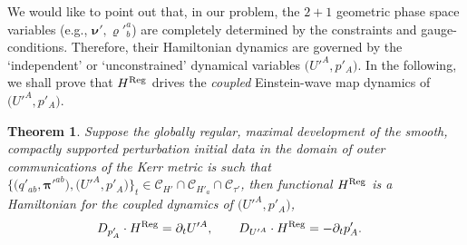 \documentclass[11pt]{article}
\numberwithin{equation}{section}
\def\ptl{\partial}%
\def\mbo#1{\boldsymbol{#1}}%
\numberwithin{equation}{section}
\newtheorem{Theorem}{Theorem}[section]
\begin{document}
We would like to point out that, in our problem, the $2+1$ geometric phase space variables \big(e.g., $\mbo{\nu}', \varrho'^a_b$\big) are completely determined by the constraints and gauge-conditions. Therefore, their Hamiltonian dynamics are governed by the `independent' or `unconstrained' dynamical variables $\bigl(U'^A, p'_A\bigr)$. In the following, we shall prove that $H^{{\rm Reg}}$ drives the \emph{coupled} Einstein-wave map dynamics of $\bigl(U'^A, p'_A\bigr)$.

\begin{Theorem}
Suppose the globally regular, maximal development of the smooth, compactly supported perturbation initial data in the domain of outer communications of the Kerr metric is such that $\bigl\{ \bigl(q'_{ab}, \mbo{\pi}'^{ab}\bigr), \bigl(U'^A, p'_A\bigr) \bigr\}_{t} \in \mathscr{C}_{H'} \cap \mathscr{C}_{H'_a} \cap \mathscr{C}_{\tau'}$, then functional $H^{{\rm Reg}}$ is a Hamiltonian for the coupled dynamics of $\bigl(U'^A, p'_A\bigr)$,
\begin{align*}
&D_{p'_A} \cdot H^{{\rm Reg}} = \ptl_t U'^A, \qquad
D_{U'^{A}} \cdot H^{{\rm Reg}} =- \ptl_t p'_A.
\end{align*}
\end{Theorem}
\end{document}
